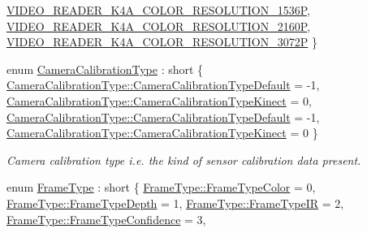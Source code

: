 \begin{DoxyCompactItemize}
\newline
\hyperlink{namespacemoetsi_1_1ssp_a012fc4787d5a6d3ddfca72b606360919a40bf6fe98326a6c45065b810829375dc}{V\+I\+D\+E\+O\+\_\+\+R\+E\+A\+D\+E\+R\+\_\+\+K4\+A\+\_\+\+C\+O\+L\+O\+R\+\_\+\+R\+E\+S\+O\+L\+U\+T\+I\+O\+N\+\_\+1536P}, 
\hyperlink{namespacemoetsi_1_1ssp_a012fc4787d5a6d3ddfca72b606360919ad4b9f7eb63c6babf8ad3ddff9f071a64}{V\+I\+D\+E\+O\+\_\+\+R\+E\+A\+D\+E\+R\+\_\+\+K4\+A\+\_\+\+C\+O\+L\+O\+R\+\_\+\+R\+E\+S\+O\+L\+U\+T\+I\+O\+N\+\_\+2160P}, 
\hyperlink{namespacemoetsi_1_1ssp_a012fc4787d5a6d3ddfca72b606360919a309b563d4eb03fe407ab99359558b4f0}{V\+I\+D\+E\+O\+\_\+\+R\+E\+A\+D\+E\+R\+\_\+\+K4\+A\+\_\+\+C\+O\+L\+O\+R\+\_\+\+R\+E\+S\+O\+L\+U\+T\+I\+O\+N\+\_\+3072P}
 \}
\item 
enum \hyperlink{namespacemoetsi_1_1ssp_a1f51291db51233dc5865d42e6ee36ef8}{Camera\+Calibration\+Type} \+: short \{ \hyperlink{namespacemoetsi_1_1ssp_a1f51291db51233dc5865d42e6ee36ef8ac32f0bb1b309dd3992d8e37bfaa00c78}{Camera\+Calibration\+Type\+::\+Camera\+Calibration\+Type\+Default} = -\/1, 
\hyperlink{namespacemoetsi_1_1ssp_a1f51291db51233dc5865d42e6ee36ef8a662285f55328b6f7305456b86b8056bb}{Camera\+Calibration\+Type\+::\+Camera\+Calibration\+Type\+Kinect} = 0, 
\hyperlink{namespacemoetsi_1_1ssp_a1f51291db51233dc5865d42e6ee36ef8ac32f0bb1b309dd3992d8e37bfaa00c78}{Camera\+Calibration\+Type\+::\+Camera\+Calibration\+Type\+Default} = -\/1, 
\hyperlink{namespacemoetsi_1_1ssp_a1f51291db51233dc5865d42e6ee36ef8a662285f55328b6f7305456b86b8056bb}{Camera\+Calibration\+Type\+::\+Camera\+Calibration\+Type\+Kinect} = 0
 \}\begin{DoxyCompactList}\small\item\em Camera calibration type i.\+e. the kind of sensor calibration data present. \end{DoxyCompactList}
\item 
enum \hyperlink{namespacemoetsi_1_1ssp_a46efdfa2cd5a28ead465dcc8006b5a87}{Frame\+Type} \+: short \{ \newline
\hyperlink{namespacemoetsi_1_1ssp_a46efdfa2cd5a28ead465dcc8006b5a87ad039a5ecd3504edc955b88006db4ba21}{Frame\+Type\+::\+Frame\+Type\+Color} = 0, 
\hyperlink{namespacemoetsi_1_1ssp_a46efdfa2cd5a28ead465dcc8006b5a87a59cea6d94577d85ef8e142036e047064}{Frame\+Type\+::\+Frame\+Type\+Depth} = 1, 
\hyperlink{namespacemoetsi_1_1ssp_a46efdfa2cd5a28ead465dcc8006b5a87a2c799f7416882b538fa8295567f65cf5}{Frame\+Type\+::\+Frame\+Type\+IR} = 2, 
\hyperlink{namespacemoetsi_1_1ssp_a46efdfa2cd5a28ead465dcc8006b5a87a1b85b2c60b857778932e29e0e5021ba1}{Frame\+Type\+::\+Frame\+Type\+Confidence} = 3, 

\end{DoxyCompactItemize}
